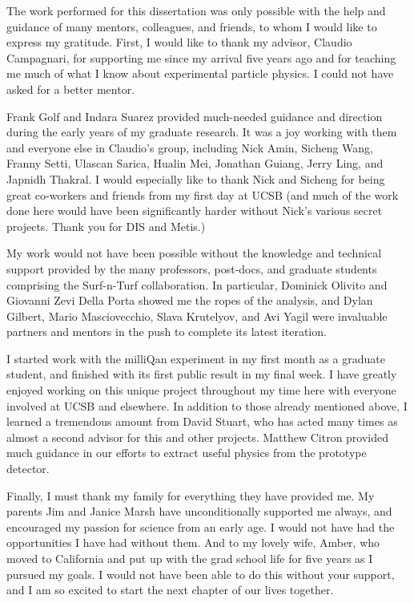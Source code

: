 \begin{acknowledgements}

The work performed for this dissertation was only possible 
with the help and guidance of many mentors, colleagues, and friends,
to whom I would like to express my gratitude.
%
First, I would like to thank my advisor, Claudio Campagnari, for
supporting me since my arrival five years ago and for teaching
me much of what I know about experimental particle physics.
I could not have asked for a better mentor.

Frank Golf and Indara Suarez provided much-needed guidance and direction
during the early years of my graduate research. 
It was a joy working with them and everyone else in Claudio's
group, including Nick Amin, Sicheng Wang, Franny Setti,
Ulascan Sarica, Hualin Mei, Jonathan Guiang, Jerry Ling, and Japnidh Thakral.
I would especially like to thank Nick and Sicheng for being great
co-workers and friends from my first day at UCSB
(and much of the work done here would have been significantly
harder without Nick's various secret projects.
Thank you for DIS and Metis.)

My work would not have been possible without the knowledge
and technical support provided by the many professors, post-docs, and
graduate students comprising the Surf-n-Turf collaboration.
In particular, Dominick Olivito and Giovanni Zevi Della Porta showed me the ropes of the \mttwo analysis,
and Dylan Gilbert, Mario Masciovecchio, Slava Krutelyov, and Avi Yagil
were invaluable partners and mentors in the push to complete its latest iteration.

I started work with the milliQan experiment in my first month as a graduate student, and finished with
its first public result in my final week. I have greatly enjoyed working on this unique
project throughout my time here with everyone involved at UCSB and elsewhere. In addition
to those already mentioned above, I learned a tremendous amount from
David Stuart, who has acted many times as almost a second advisor for this and other projects.
Matthew Citron provided much guidance in our efforts to extract
useful physics from the prototype detector.

Finally, I must thank my family for everything they have provided me. My parents Jim and Janice Marsh
have unconditionally supported me always, and encouraged my passion for science from an early age.
I would not have had the opportunities I have had without them.
And to my lovely wife, Amber, who moved to California and put up with the grad school life for five years
as I pursued my goals. I would not have been able to do this without your support, and I am so excited
to start the next chapter of our lives together.


\end{acknowledgements} 
